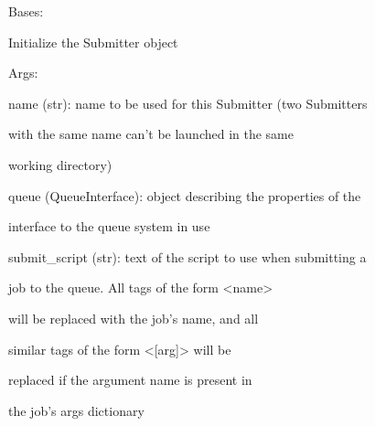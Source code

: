\documentclass[letterpaper,10pt,english]{sphinxmanual}
\begin{document}
\begin{fulllineitems}
\label{doctree/soprano.hpc.submitter.castep:soprano.hpc.submitter.castep.CastepSubmitter}
Bases: {\hyperref[doctree/soprano.hpc.submitter.submit:soprano.hpc.submitter.submit.Submitter]{\emph{}}}

Initialize the Submitter object

\begin{DUlineblock}{0em}
\item[] Args:
\item[]
\begin{DUlineblock}{\DUlineblockindent}
\item[] name (str): name to be used for this Submitter (two Submitters
\item[]
\begin{DUlineblock}{\DUlineblockindent}
\item[] with the same name can't be launched in the same
\item[] working directory)
\end{DUlineblock}
\item[] queue (QueueInterface): object describing the properties of the
\item[]
\begin{DUlineblock}{\DUlineblockindent}
\item[] interface to the queue system in use
\end{DUlineblock}
\item[] submit\_script (str): text of the script to use when submitting a
\item[]
\begin{DUlineblock}{\DUlineblockindent}
\item[] job to the queue. All tags of the form \textless{}name\textgreater{}
\item[] will be replaced with the job's name, and all
\item[] similar tags of the form \textless{}{[}arg{]}\textgreater{} will be
\item[] replaced if the argument name is present in
\item[] the job's args dictionary
\end{DUlineblock}

\end{DUlineblock}
\end{DUlineblock}
\end{fulllineitems}
\end{document}
